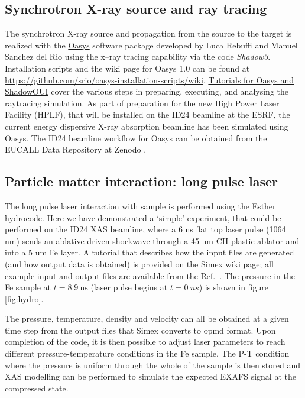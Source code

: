 \subsection{Synchrotron X-ray source and ray tracing}
The synchrotron X-ray source and propagation from the source to the target is
realized with the \href{http://ftp.esrf.eu/pub/scisoft/Oasys/readme.html}{Oasys}
software package developed by Luca Rebuffi and Manuel Sanchez del Rio
 using the x--ray tracing
capability via the code \textit{Shadow3}. Installation scripts and the wiki page for Oasys 1.0 can be
found at
\href{https://github.com/srio/oasys-installation-scripts/wiki}{https://github.com/srio/oasys-installation-scripts/wiki}.
\href{https://github.com/srio/ShadowOui-Tutorial}{Tutorials for
Oasys and ShadowOUI} cover the various steps in preparing, executing, and
analysing the raytracing simulation. As part of preparation for the new High Power
Laser Facility (HPLF), that will be installed on the ID24 beamline at the ESRF,
the current energy dispersive X-ray absorption beamline has been simulated using
Oasys.
The ID24 beamline workflow for Oasys can be obtained from the EUCALL Data
Repository at Zenodo \cite{Briggs2017.zenodo.886451}.

\subsection{Particle matter interaction: long pulse laser}
The long pulse laser interaction with sample is performed using the Esther hydrocode.
Here we have demonstrated a `simple' experiment, that could be performed on the
ID24 XAS beamline, where a 6 ns flat top laser pulse (1064 nm) sends an ablative
driven shockwave through a 45 um CH-plastic ablator and into a 5 um Fe layer. A
tutorial that describes how the input files are generated (and how output data is
obtained) is provided on the
\href{https://www.github.com/eucall-software/simex_platform/wiki/Esther-Hydrocode-Tutorial}{Simex
wiki page}; all example input
and output files are available from the Ref.~\cite{Briggs2017.zenodo.883106}.
The pressure in the Fe sample at $t = \SI{8.9}{\nano\second}$
(laser pulse begins at $t = \SI{0}{ns}$) is shown in figure \ref{fig:hydro}.

 The pressure, temperature, density and velocity can all be obtained at a given
 time step from the output files that Simex converts to opmd format. Upon
 completion of the code, it is then possible to adjust laser parameters to reach
 different pressure-temperature conditions in the Fe sample. The P-T condition
 where the pressure is uniform through the whole of the sample is then stored and
 XAS modelling can be performed to simulate the expected EXAFS signal at
 the compressed state.

